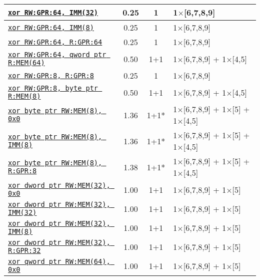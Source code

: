 \documentclass[a4paper,english,fontsize=9]{scrartcl}
\begin{document}
\begin{longtable}{p{}ccL{.25\textwidth}}
  \midrule
  \texttt{\href{https://felixcloutier.com/x86/XOR.html}{xor RW:GPR:64, IMM(32)}} & 0.25 & 1 & 1\(\times\)[6,7,8,9] \\
  \midrule
  \texttt{\href{https://felixcloutier.com/x86/XOR.html}{xor RW:GPR:64, IMM(8)}} & 0.25 & 1 & 1\(\times\)[6,7,8,9] \\
  \midrule
  \texttt{\href{https://felixcloutier.com/x86/XOR.html}{xor RW:GPR:64, R:GPR:64}} & 0.25 & 1 & 1\(\times\)[6,7,8,9] \\
  \midrule
  \texttt{\href{https://felixcloutier.com/x86/XOR.html}{xor RW:GPR:64, qword ptr R:MEM(64)}} & 0.50 & 1+1 & 1\(\times\)[6,7,8,9] + 1\(\times\)[4,5] \\
  \midrule
  \texttt{\href{https://felixcloutier.com/x86/XOR.html}{xor RW:GPR:8, R:GPR:8}} & 0.25 & 1 & 1\(\times\)[6,7,8,9] \\
  \midrule
  \texttt{\href{https://felixcloutier.com/x86/XOR.html}{xor RW:GPR:8, byte ptr R:MEM(8)}} & 0.50 & 1+1 & 1\(\times\)[6,7,8,9] + 1\(\times\)[4,5] \\
  \midrule
  \texttt{\href{https://felixcloutier.com/x86/XOR.html}{xor byte ptr RW:MEM(8), 0x0}} & 1.36 & 1+1* & 1\(\times\)[6,7,8,9] + 1\(\times\)[5] + 1\(\times\)[4,5] \\
  \midrule
  \texttt{\href{https://felixcloutier.com/x86/XOR.html}{xor byte ptr RW:MEM(8), IMM(8)}} & 1.36 & 1+1* & 1\(\times\)[6,7,8,9] + 1\(\times\)[5] + 1\(\times\)[4,5] \\
  \midrule
  \texttt{\href{https://felixcloutier.com/x86/XOR.html}{xor byte ptr RW:MEM(8), R:GPR:8}} & 1.38 & 1+1* & 1\(\times\)[6,7,8,9] + 1\(\times\)[5] + 1\(\times\)[4,5] \\
  \midrule
  \texttt{\href{https://felixcloutier.com/x86/XOR.html}{xor dword ptr RW:MEM(32), 0x0}} & 1.00 & 1+1 & 1\(\times\)[6,7,8,9] + 1\(\times\)[5] \\
  \midrule
  \texttt{\href{https://felixcloutier.com/x86/XOR.html}{xor dword ptr RW:MEM(32), IMM(32)}} & 1.00 & 1+1 & 1\(\times\)[6,7,8,9] + 1\(\times\)[5] \\
  \midrule
  \texttt{\href{https://felixcloutier.com/x86/XOR.html}{xor dword ptr RW:MEM(32), IMM(8)}} & 1.00 & 1+1 & 1\(\times\)[6,7,8,9] + 1\(\times\)[5] \\
  \midrule
  \texttt{\href{https://felixcloutier.com/x86/XOR.html}{xor dword ptr RW:MEM(32), R:GPR:32}} & 1.00 & 1+1 & 1\(\times\)[6,7,8,9] + 1\(\times\)[5] \\
  \midrule
  \texttt{\href{https://felixcloutier.com/x86/XOR.html}{xor qword ptr RW:MEM(64), 0x0}} & 1.00 & 1+1 & 1\(\times\)[6,7,8,9] + 1\(\times\)[5] \\

\end{longtable}
\end{document}
